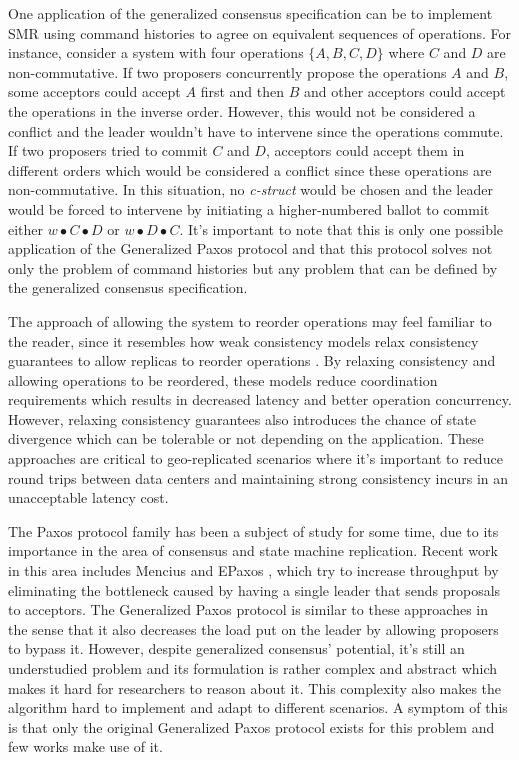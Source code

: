 \documentclass[runningheads,a4paper]{llncs}
\begin{document}
One application of the generalized consensus specification can be to implement SMR using command histories to agree on equivalent sequences of operations. For instance, consider a system with four operations $\{A, B, C, D\}$ where $C$ and $D$ are non-commutative. If two proposers concurrently propose the operations $A$ and $B$, some acceptors could accept $A$ first and then $B$ and other acceptors could accept the operations in the inverse order. However, this would not be considered a conflict and the leader wouldn't have to intervene since the operations commute. If two proposers tried to commit $C$ and $D$, acceptors could accept them in different orders which would be considered a conflict since these operations are non-commutative. In this situation, no \textit{c-struct} would be chosen and the leader would be forced to intervene by initiating a higher-numbered ballot to commit either $w \bullet C \bullet D$ or $w \bullet D \bullet C$. It's important to note that this is only one possible application of the Generalized Paxos protocol and that this protocol solves not only the problem of command histories but any problem that can be defined by the generalized consensus specification. \par
The approach of allowing the system to reorder operations may feel familiar to the reader, since it resembles how weak consistency models relax consistency guarantees to allow replicas to reorder operations \cite{Ladin1992}. By relaxing consistency and allowing operations to be reordered, these models reduce coordination requirements which results in decreased latency and better operation concurrency. However, relaxing consistency guarantees also introduces the chance of state divergence which can be tolerable or not depending on the application. These approaches are critical to geo-replicated scenarios where it's important to reduce round trips between data centers and maintaining strong consistency incurs in an unacceptable latency cost. \par
The Paxos protocol family has been a subject of study for some time, due to its importance in the area of consensus and state machine replication. Recent work in this area includes Mencius \cite{Mao2008} and EPaxos \cite{Moraru2013}, which try to increase throughput by eliminating the bottleneck caused by having a single leader that sends proposals to acceptors. The Generalized Paxos protocol is similar to these approaches in the sense that it also decreases the load put on the leader by allowing proposers to bypass it. However, despite generalized consensus' potential, it's still an understudied problem and its formulation is rather complex and abstract which makes it hard for researchers to reason about it. This complexity also makes the algorithm hard to implement and adapt to different scenarios. A symptom of this is that only the original Generalized Paxos protocol exists for this problem and few works make use of it.  \par
\end{document}
